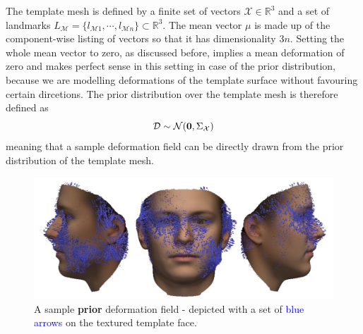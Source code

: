 The template mesh is defined by a finite set of vectors $\mathcal{X} \in \mathbb{R}^3$ and a set of landmarks $L_\mathcal{M}=\{l_{\mathcal{M}1}, \cdots, l_{\mathcal{M}n}\} \subset \mathbb{R}^3$.
The mean vector $\mu$ is made up of the component-wise listing of vectors so that it has dimensionality $3n$. Setting the whole mean vector to zero, as discussed before, implies a mean deformation of zero and makes perfect sense in this setting in case of the prior distribution, because we are modelling deformations of the template surface without favouring certain dircetions. 
The prior distribution over the template mesh is therefore defined as 
\begin{equation}
    \mathcal{D} \sim \mathcal{N}(\textbf{0}, \Sigma_{\mathcal{X}})
\end{equation}
meaning that a sample deformation field can be directly drawn from the prior distribution of the template mesh.
\begin{figure}[h!]
    \includegraphics[width=\textwidth]{./resources/img/prior_deformations.pdf}
    \caption{A sample \textbf{prior} deformation field - depicted with a set of \textcolor{blue}{blue arrows} on the textured template face.}
\label{fig:priordeformations}
\end{figure}
